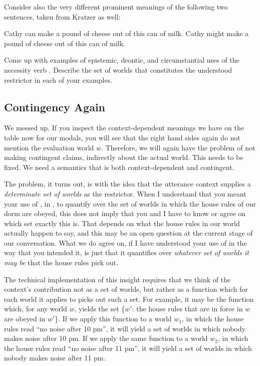 \noindent Consider also the very different prominent meanings of the
following two sentences, taken from Kratzer as well:

\pex \a Cathy can make a pound of cheese out of this can of milk. 
\a Cathy might make a pound of cheese out of this can of milk. \xe

\begin{exercise}
  Come up with examples of epistemic, deontic, and circumstantial uses
  of the necessity verb . Describe the set of
  worlds that constitutes the understood restrictor in each of your
  examples. \eex
\end{exercise}

\subsection{Contingency Again}

We messed up. If you inspect the context-dependent meanings we have on
the table now for our modals, you will see that the right hand sides
again do not mention the evaluation world $w$. Therefore, we will
again have the problem of not making contingent claims, indirectly
about the actual world. This needs to be fixed. We need a semantics
that is both context-dependent and contingent.

The problem, it turns out, is with the idea that the utterance context
supplies a \emph{determinate set of worlds} as the restrictor. When I
understand that you meant your use of , in
, to quantify over the set of worlds in
which the house rules of our dorm are obeyed, this does not imply that
you and I have to know or agree on which set exactly this is. That
depends on what the house rules in our world actually happen to say,
and this may be an open question at the current stage of our
conversation. What we do agree on, if I have understood your use of
 in the way that you intended it, is just that it
quantifies over \emph{whatever set of worlds it may be} that the house
rules pick out.

The technical implementation of this 
insight requires that we think
of the context's contribution not as a set of worlds, but rather as a
function which for each world it applies to picks out such a set. For
example, it may be the function which, for any world $w$, yields the
set \{$w'$: the house rules that are in force in $w$ are obeyed in
$w'$\}. If we apply this function to a world $w_{1}$, in which the
house rules read ``no noise after 10 pm'', it will yield a set of
worlds in which nobody makes noise after 10 pm. If we apply the same
function to a world $w_{2}$, in which the house rules read ``no noise
after 11 pm'', it will yield a set of worlds in which nobody makes
noise after 11 pm.


